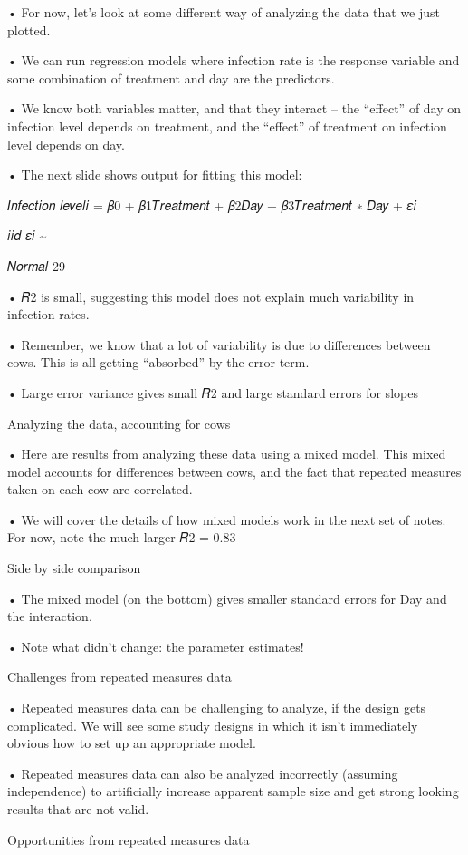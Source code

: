 \documentclass[
  letterpaper,
  DIV=11,
  numbers=noendperiod]{scrreprt}
\begin{document}
• For now, let's look at some different way of analyzing the data that
we just plotted.

• We can run regression models where infection rate is the response
variable and some combination of treatment and day are the predictors.

• We know both variables matter, and that they interact -- the
``effect'' of day on infection level depends on treatment, and the
``effect'' of treatment on infection level depends on day.

• The next slide shows output for fitting this model:

𝐼𝑛𝑓𝑒𝑐𝑡𝑖𝑜𝑛 𝑙𝑒𝑣𝑒𝑙𝑖 = 𝛽0 + 𝛽1𝑇𝑟𝑒𝑎𝑡𝑚𝑒𝑛𝑡 + 𝛽2𝐷𝑎𝑦 + 𝛽3𝑇𝑟𝑒𝑎𝑡𝑚𝑒𝑛𝑡 ∗ 𝐷𝑎𝑦 + 𝜀𝑖

𝑖𝑖𝑑 𝜀𝑖 \textasciitilde{}

𝑁𝑜𝑟𝑚𝑎𝑙 29

• 𝑅2 is small, suggesting this model does not explain much variability
in infection rates.

• Remember, we know that a lot of variability is due to differences
between cows. This is all getting ``absorbed'' by the error term.

• Large error variance gives small 𝑅2 and large standard errors for
slopes

Analyzing the data, accounting for cows

• Here are results from analyzing these data using a mixed model. This
mixed model accounts for differences between cows, and the fact that
repeated measures taken on each cow are correlated.

• We will cover the details of how mixed models work in the next set of
notes. For now, note the much larger 𝑅2 = 0.83

Side by side comparison

• The mixed model (on the bottom) gives smaller standard errors for Day
and the interaction.

• Note what didn't change: the parameter estimates!

Challenges from repeated measures data

• Repeated measures data can be challenging to analyze, if the design
gets complicated. We will see some study designs in which it isn't
immediately obvious how to set up an appropriate model.

• Repeated measures data can also be analyzed incorrectly (assuming
independence) to artificially increase apparent sample size and get
strong looking results that are not valid.

Opportunities from repeated measures data
\end{document}
